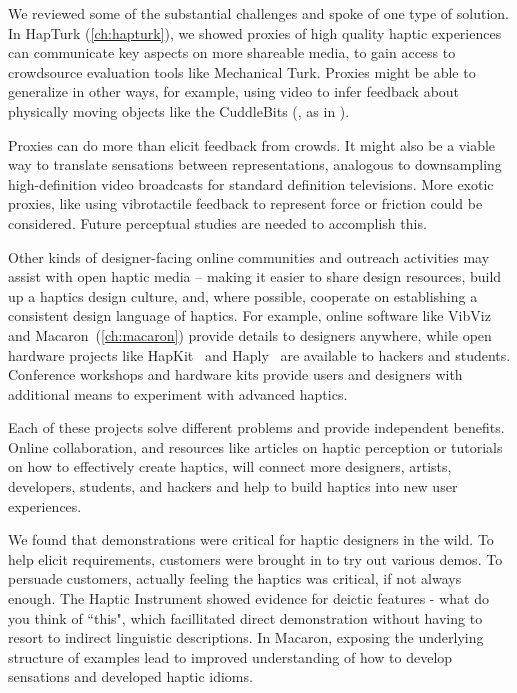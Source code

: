     We reviewed some of the substantial challenges and spoke of one type of solution.
    In HapTurk (\autoref{ch:hapturk}), we showed proxies of high quality haptic experiences  can communicate key aspects on more shareable media, to gain access to crowdsource evaluation tools like Mechanical Turk.
    Proxies might be able to generalize in other ways, for example, using video to infer feedback about physically moving objects like the CuddleBits (\eg, as in \cite{Pedersen2014}).

    Proxies can do more than elicit feedback from crowds.
    It might also be a viable way to translate sensations between representations, analogous to downsampling high-definition video broadcasts for standard definition televisions.
    More exotic proxies, like using vibrotactile feedback to represent force or friction could be considered. 
    Future perceptual studies are needed to accomplish this.
    
    Other kinds of designer-facing online communities and outreach activities may assist with open haptic media -- making it easier to share design resources,  build up a haptics design culture, and, where possible, cooperate on establishing a consistent design language of haptics. 
%
    For example, online software like VibViz~\cite{Seifi2015} and Macaron~(\autoref{ch:macaron}) provide details to designers anywhere, while open hardware projects like HapKit~\cite{Martinez2016} and Haply~\cite{Gallacher2016} are available to hackers and students.
    Conference workshops and hardware kits provide users and designers with additional means to experiment with advanced haptics.
    
    Each of these projects solve different problems and provide independent benefits.
    Online collaboration, and resources like articles on haptic perception or tutorials on how to effectively create haptics, will connect more designers, artists, developers, students, and hackers and help to build haptics into new user experiences.


We found that demonstrations were critical for haptic designers in the wild.
To help elicit requirements, customers were brought in to try out various demos.
To persuade customers, actually feeling the haptics was critical, if not always enough.
The Haptic Instrument showed evidence for deictic features - what do you think of ``this", which facillitated direct demonstration without having to resort to indirect linguistic descriptions.
In Macaron, exposing the underlying structure of examples lead to improved understanding of how to develop sensations and developed haptic idioms.


